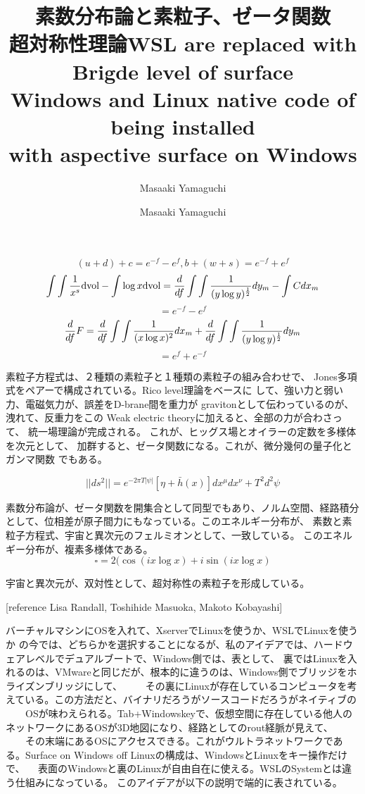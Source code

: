 \documentclass{jsarticle}
\begin{document}
{\newpage
\title{素数分布論と素粒子、ゼータ関数　\\
超対称性理論}
\author{Masaaki Yamaguchi}

   $$ (u + d) + c = e^{-f} - e^{f}, b + (w + s) = e^{-f} + e^{f} $$
   $$ \int \int{1 \over x^s}\mathrm{dvol} - \int \log x \mathrm{dvol}
   = {d \over df}\int\int{1 \over (y \log y)^{1 \over 2}}dy_m
   - \int C dx_m $$
   $$ = e^{-f} - e^{f} $$
   $$ {d \over df}F = {d \over df}\int \int{1 \over (x \log x)^2}dx_m 
   + {d \over df}\int\int{1 \over (y \log y)^{1 \over 2}}dy_m $$
   $$ = e^{f} + e^{-f} $$

     素粒子方程式は、２種類の素粒子と１種類の素粒子の組み合わせで、
   Jones多項式をペアーで構成されている。Rico level理論をベースに
   して、強い力と弱い力、電磁気力が、誤差をD-brane間を重力が
   gravitonとして伝わっているのが、洩れて、反重力をこの
   Weak electric theoryに加えると、全部の力が合わさって、
   統一場理論が完成される。
   これが、ヒッグス場とオイラーの定数を多様体を次元として、
   加群すると、ゼータ関数になる。これが、微分幾何の量子化とガンマ関数
   でもある。

   $$ ||ds^2|| = e^{-2 \pi T|\psi|}[\eta + \bar{h}(x)]dx^{\mu}dx^{\nu}
   + T^2 d^2 \psi $$
   
      素数分布論が、ゼータ関数を開集合として同型でもあり、ノルム空間、経路積分
   として、位相差が原子間力にもなっている。このエネルギー分布が、
   素数と素粒子方程式、宇宙と異次元のフェルミオンとして、一致している。
   このエネルギー分布が、複素多様体である。
   $$\square = 2 (\cos (i x \log x) + i \sin(i x \log x) $$ 


      宇宙と異次元が、双対性として、超対称性の素粒子を形成している。　

      [reference Lisa Randall, Toshihide Masuoka, Makoto Kobayashi]

\newpage
\title{WSL are replaced with Brigde level of surface \\
Windows and Linux native code of being installed \\
with aspective surface on Windows}
\author{Masaaki Yamaguchi}

   

        バーチャルマシンにOSを入れて、XserverでLinuxを使うか、WSLでLinuxを使うか
   の今では、どちらかを選択することになるが、私のアイデアでは、ハードウェアレベルでデュアルブートで、Windows側では、表として、
   裏ではLinuxを入れるのは、VMwareと同じだが、根本的に違うのは、Windows側でブリッジをホライズンブリッジにして、
　　その裏にLinuxが存在しているコンピュータを考えている。この方法だと、バイナリだろうがソースコードだろうがネイティブの
　　OSが味わえられる。Tab+Windowskeyで、仮想空間に存在している他人のネットワークにあるOSが3D地図になり、経路としてのrout経脈が見えて、
　　その末端にあるOSにアクセスできる。これがウルトラネットワークである。Surface on Windows off Linuxの構成は、WindowsとLinuxをキー操作だけで、
　表面のWindowsと裏のLinuxが自由自在に使える。WSLのSystemとは違う仕組みになっている。
   このアイデアが以下の説明で端的に表されている。 


}
\end{document}
